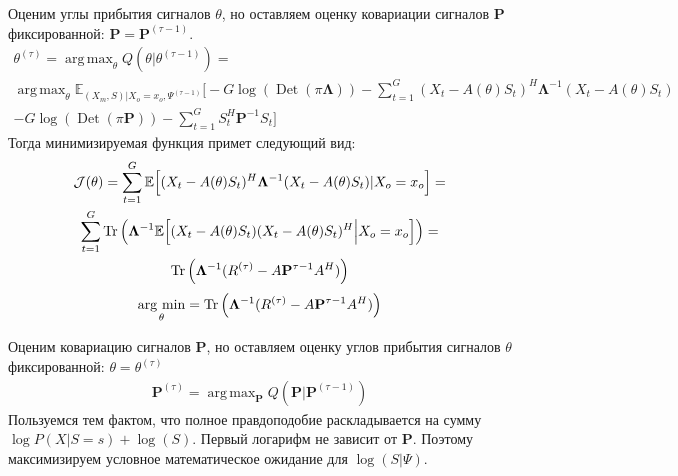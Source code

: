 \documentclass[11pt]{article}
\newcommand{\Expect}{\mathbb{E}}
\DeclareMathOperator*{\argmax}{arg \, \max}
\DeclareMathOperator*{\argmin}{arg \, \min}
\DeclareMathOperator{\Det}{Det}
\begin{document}
\begin{center}
\fontsize{14}{18}\selectfont {}
\end{center}
Оценим углы прибытия сигналов $\theta$, но оставляем оценку ковариации сигналов $\mathbf{P}$ фиксированной: $\mathbf{P} = \mathbf{P}^{(\tau-1)}$.
\begin{equation*}
\begin{gathered}
\theta^{(\tau)}= \argmax_{\theta} Q(\theta | \theta^{(\tau-1)}) = \\
\argmax_{\theta} \Expect_{(X_m,S)|X_o=x_o, \Psi^{(\tau-1)}}\bigg[-G \log (\Det(\pi \mathbf{\Lambda})) - \sum_{t=1}^G (X_t-A(\theta)S_t)^H \mathbf{\Lambda}^{-1}(X_t-A(\theta)S_t) 
\\ - G \log(\Det(\pi \mathbf{P})) - \sum_{t=1}^G S_t^H \mathbf{P}^{-1}S_t\bigg]
\end{gathered}
\end{equation*}
Тогда минимизируемая функция примет следующий вид:
\begin{equation*}
\begin{gathered}
\mathcal{J}(\theta) = \sum_{t=1}^G \Expect \Big[ (X_t-A(\theta)S_t)^H\mathbf{\Lambda}^{-1}(X_t-A(\theta)S_t) \text{|}X_o = x_o\Big] = \\
\sum_{t=1}^G \Tr \Big( \mathbf{\Lambda}^{-1} \Expect \Big[ (X_t-A(\theta)S_t)(X_t-A(\theta)S_t)^H \Big{|}X_o = x_o \Big] \Big) = \\
\Tr \Big( \mathbf{\Lambda}^{-1} ({R}^{(\tau)} - A\mathbf{P}^{\tau-1}A^H) \Big)
\end{gathered}
\end{equation*}
\begin{equation}
\argmin_{\theta} = \Tr \Big( \mathbf{\Lambda}^{-1} ({R}^{(\tau)} - A\mathbf{P}^{\tau-1}A^H) \Big)
\end{equation}
\begin{center}
\fontsize{14}{18}\selectfont {}
\end{center}
Оценим ковариацию сигналов $\mathbf{P}$, но оставляем оценку углов прибытия сигналов $\theta$ фиксированной: $\theta = \theta^{(\tau)}$
\begin{equation*}
\begin{gathered}
\mathbf{P}^{(\tau)}= \argmax_{\mathbf{P}} Q(\mathbf{P} | \mathbf{P}^{(\tau-1)}) 
\end{gathered}
\end{equation*}
Пользуемся тем фактом, что полное правдоподобие раскладывается на сумму $\log P(X|S=s) + \log(S)$. Первый логарифм не зависит от $\mathbf{P}$. Поэтому максимизируем условное математическое ожидание  для $\log(S| \Psi)$.
\end{document}

